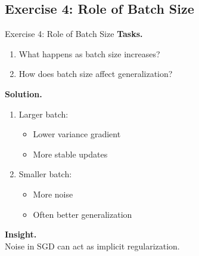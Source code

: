 \documentclass[aspectratio=169,11pt]{beamer}
\begin{document}
\subsection{Exercise 4: Role of Batch Size}
\begin{frame}[t,allowframebreaks]{Exercise 4: Role of Batch Size}
\small
\textbf{Tasks.}\\ \begin{enumerate}
    \item What happens as batch size increases?
    \item How does batch size affect generalization?
\end{enumerate}

\textbf{Solution.}\\ \begin{enumerate}
\item Larger batch:
\begin{itemize}
    \item Lower variance gradient
    \item More stable updates
\end{itemize}

\item Smaller batch:
\begin{itemize}
    \item More noise
    \item Often better generalization
\end{itemize}
\end{enumerate}

\textbf{Insight.}\\ Noise in SGD can act as implicit regularization.
\end{frame}
\end{document}

